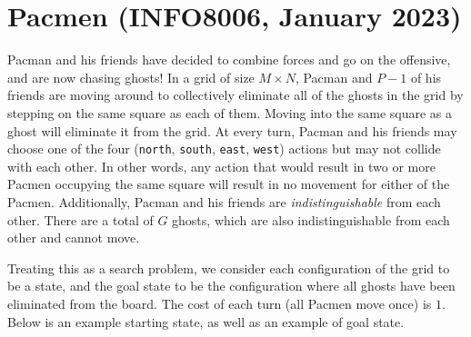 \documentclass[11pt, a4paper]{article}
\begin{document}
\section{Pacmen (INFO8006, January 2023)}

Pacman and his friends have decided to combine forces and go on the offensive, and are now chasing ghosts! In a grid of size $M \times N$, Pacman and $P - 1$ of his friends are moving around to collectively eliminate all of the ghosts in the grid by stepping on the same square as each of them. Moving into the same square as a ghost will eliminate it from the grid. At every turn, Pacman and his friends may choose one of the four (\texttt{north}, \texttt{south}, \texttt{east}, \texttt{west}) actions but may not collide with each other. In other words, any action that would result in two or more Pacmen occupying the same square will result in no movement for either of the Pacmen. Additionally, Pacman and his friends are \emph{indistinguishable} from each other. There are a total of $G$ ghosts, which are also indistinguishable from each other and cannot move.

Treating this as a search problem, we consider each configuration of the grid to be a state, and the goal state to be the configuration where all ghosts have been eliminated from the board. The cost of each turn (all Pacmen move once) is $1$. Below is an example starting state, as well as an example of goal state.
\end{document}
